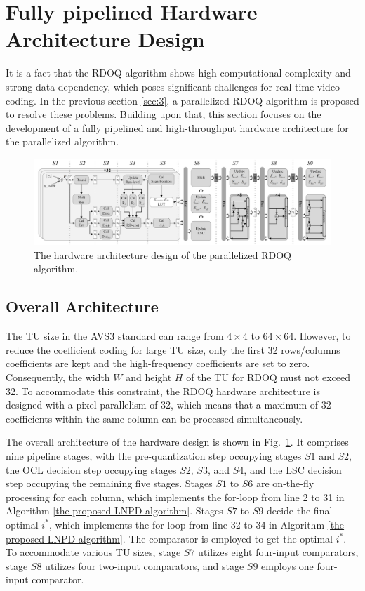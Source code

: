 \documentclass[lettersize,journal]{IEEEtran}
\begin{document}
\section{Fully pipelined Hardware Architecture Design}
\label{sec:4}
It is a fact that the RDOQ algorithm shows high computational complexity and strong data dependency, which poses significant challenges for real-time video coding. In the previous section \ref{sec:3}, a parallelized RDOQ algorithm is proposed to resolve these problems. Building upon that, this section focuses on the development of a fully pipelined and high-throughput hardware architecture for the parallelized algorithm. 
\par
\begin{figure}[htbp]
	\centering
	\centerline{\includegraphics[width=1.00\textwidth]{figure/overall_architecture.png}} 
	\caption{The hardware architecture design of the parallelized RDOQ algorithm.}
	\label{overall_architecture} %
\end{figure}

\subsection{Overall Architecture}
The TU size in the AVS3 standard can range from $4\times4$ to $64\times64$. However, to reduce the coefficient coding for large TU size, only the first 32 rows/columns coefficients are kept and the high-frequency coefficients are set to zero. Consequently, the width $W$ and height $H$ of the TU for RDOQ must not exceed 32. To accommodate this constraint, the RDOQ hardware architecture is designed with a pixel parallelism of 32, which means that a maximum of 32 coefficients within the same column can be processed simultaneously. 

The overall architecture of the hardware design is shown in Fig.~\ref{overall_architecture}. It comprises nine pipeline stages, with the pre-quantization step occupying stages $S1$ and $S2$, the OCL decision step occupying stages $S2$, $S3$, and $S4$, and the LSC decision step occupying the remaining five stages. Stages $S1$ to $S6$ are on-the-fly processing for each column, which implements the for-loop from line 2 to 31 in Algorithm \ref{the proposed LNPD algorithm}. Stages $S7$ to $S9$ decide the final optimal $i_{}^{*}$, which implements the for-loop from line 32 to 34 in Algorithm \ref{the proposed LNPD algorithm}. The comparator is employed to get the optimal $i_{}^{*}$. To accommodate various TU sizes, stage $S7$ utilizes eight four-input comparators, stage $S8$ utilizes four two-input comparators, and stage $S9$ employs one four-input comparator. 
\end{document}
